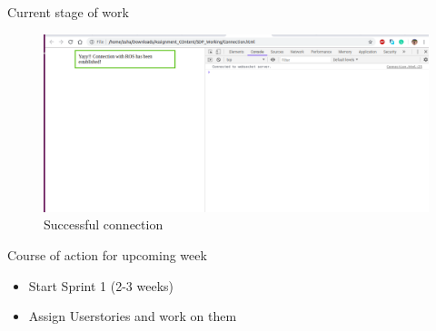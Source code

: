 \documentclass[aspectratio=169]{beamer}
\begin{document}
\begin{frame}{Current stage of work}
\begin{figure}
  \includegraphics[width=0.8\linewidth]{Connection.png}
  \caption{Successful connection}
  \label{fig:Connected}
\end{figure}
\end{frame}

\begin{frame}{Course of action for upcoming week}
\vspace*{-15mm}
\linespread{2}
	\begin{itemize}
	\item Start Sprint 1 (2-3 weeks)
	\item Assign Userstories and work on them
	\end{itemize}
\end{frame}
\end{document}
